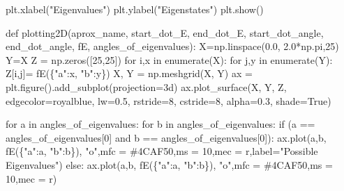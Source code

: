 \documentclass[
  letterpaper,
  DIV=11,
  numbers=noendperiod]{scrartcl}
\newenvironment{Shaded}{\begin{snugshade}}{\end{snugshade}}
\newcommand{\BuiltInTok}[1]{\textcolor[rgb]{0.00,0.23,0.31}{#1}}
\newcommand{\ControlFlowTok}[1]{\textcolor[rgb]{0.00,0.23,0.31}{#1}}
\newcommand{\DecValTok}[1]{\textcolor[rgb]{0.68,0.00,0.00}{#1}}
\newcommand{\FloatTok}[1]{\textcolor[rgb]{0.68,0.00,0.00}{#1}}
\newcommand{\KeywordTok}[1]{\textcolor[rgb]{0.00,0.23,0.31}{#1}}
\newcommand{\NormalTok}[1]{\textcolor[rgb]{0.00,0.23,0.31}{#1}}
\newcommand{\OperatorTok}[1]{\textcolor[rgb]{0.37,0.37,0.37}{#1}}
\newcommand{\StringTok}[1]{\textcolor[rgb]{0.13,0.47,0.30}{#1}}
\newcommand{\VariableTok}[1]{\textcolor[rgb]{0.07,0.07,0.07}{#1}}
\begin{document}
\begin{Shaded}
\begin{Highlighting}[]
\NormalTok{        plt.xlabel(}\StringTok{"Eigenvalues"}\NormalTok{)}
\NormalTok{        plt.ylabel(}\StringTok{"Eigenstates"}\NormalTok{)}
\NormalTok{        plt.show()}


    \KeywordTok{def}\NormalTok{ plotting2D(aprox\_name, start\_dot\_E, end\_dot\_E, start\_dot\_angle, end\_dot\_angle, fE, angles\_of\_eigenvalues):}
\NormalTok{        X}\OperatorTok{=}\NormalTok{np.linspace(}\FloatTok{0.0}\NormalTok{, }\FloatTok{2.0}\OperatorTok{*}\NormalTok{np.pi,}\DecValTok{25}\NormalTok{)}
\NormalTok{        Y}\OperatorTok{=}\NormalTok{X}
\NormalTok{        Z }\OperatorTok{=}\NormalTok{ np.zeros([}\DecValTok{25}\NormalTok{,}\DecValTok{25}\NormalTok{])}
        \ControlFlowTok{for}\NormalTok{ i,x }\KeywordTok{in} \BuiltInTok{enumerate}\NormalTok{(X):}
            \ControlFlowTok{for}\NormalTok{ j,y }\KeywordTok{in} \BuiltInTok{enumerate}\NormalTok{(Y):}
\NormalTok{                Z[i,j]}\OperatorTok{=}\NormalTok{ fE(\{}\StringTok{"a"}\NormalTok{:x, }\StringTok{"b"}\NormalTok{:y\})}
\NormalTok{        X, Y }\OperatorTok{=}\NormalTok{ np.meshgrid(X, Y)}
\NormalTok{        ax }\OperatorTok{=}\NormalTok{ plt.figure().add\_subplot(projection}\OperatorTok{=}\StringTok{\textquotesingle{}3d\textquotesingle{}}\NormalTok{)}
\NormalTok{        ax.plot\_surface(X, Y, Z, edgecolor}\OperatorTok{=}\StringTok{\textquotesingle{}royalblue\textquotesingle{}}\NormalTok{, lw}\OperatorTok{=}\FloatTok{0.5}\NormalTok{, rstride}\OperatorTok{=}\DecValTok{8}\NormalTok{, cstride}\OperatorTok{=}\DecValTok{8}\NormalTok{,}
\NormalTok{                        alpha}\OperatorTok{=}\FloatTok{0.3}\NormalTok{, shade}\OperatorTok{=}\VariableTok{True}\NormalTok{)}
        
        \ControlFlowTok{for}\NormalTok{ a }\KeywordTok{in}\NormalTok{ angles\_of\_eigenvalues:}
            \ControlFlowTok{for}\NormalTok{ b }\KeywordTok{in}\NormalTok{ angles\_of\_eigenvalues:}
                \ControlFlowTok{if}\NormalTok{ (a }\OperatorTok{==}\NormalTok{ angles\_of\_eigenvalues[}\DecValTok{0}\NormalTok{] }\KeywordTok{and}\NormalTok{ b }\OperatorTok{==}\NormalTok{ angles\_of\_eigenvalues[}\DecValTok{0}\NormalTok{]):}
\NormalTok{                    ax.plot(a,b, fE(\{}\StringTok{"a"}\NormalTok{:a, }\StringTok{"b"}\NormalTok{:b\}), }\StringTok{"o"}\NormalTok{,mfc }\OperatorTok{=} \StringTok{\textquotesingle{}\#4CAF50\textquotesingle{}}\NormalTok{,ms }\OperatorTok{=} \DecValTok{10}\NormalTok{,mec }\OperatorTok{=} \StringTok{\textquotesingle{}r\textquotesingle{}}\NormalTok{,label}\OperatorTok{=}\StringTok{"Possible Eigenvalues"}\NormalTok{)}
                \ControlFlowTok{else}\NormalTok{:}
\NormalTok{                    ax.plot(a,b, fE(\{}\StringTok{"a"}\NormalTok{:a, }\StringTok{"b"}\NormalTok{:b\}), }\StringTok{"o"}\NormalTok{,mfc }\OperatorTok{=} \StringTok{\textquotesingle{}\#4CAF50\textquotesingle{}}\NormalTok{,ms }\OperatorTok{=} \DecValTok{10}\NormalTok{,mec }\OperatorTok{=} \StringTok{\textquotesingle{}r\textquotesingle{}}\NormalTok{)}


\end{Highlighting}
\end{Shaded}
\end{document}
